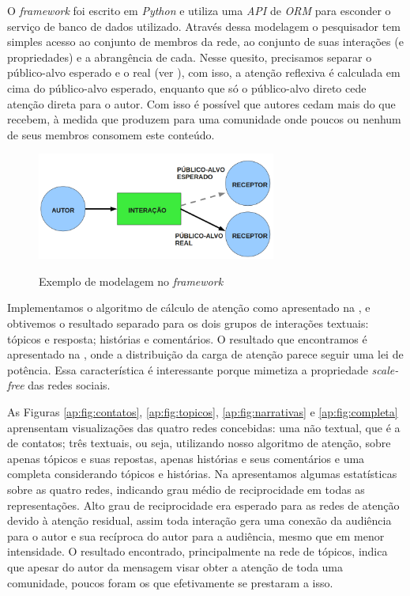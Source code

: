 O \emph{framework} foi escrito em \emph{Python} e utiliza uma \emph{API} de
\emph{ORM} para esconder o serviço de banco de dados utilizado. Através dessa
modelagem o pesquisador tem simples acesso ao conjunto de membros da rede, ao
conjunto de suas interações (e propriedades) e a abrangência de cada. Nesse
quesito, precisamos separar o público-alvo esperado e o real (ver
), com isso, a atenção reflexiva é calculada em cima do
público-alvo esperado, enquanto que só o público-alvo direto cede atenção direta
para o autor. Com isso é possível que autores cedam mais do que recebem, à medida
que produzem para uma comunidade onde poucos ou nenhum de seus membros consomem
este conteúdo.

\begin{figure}[h!]
  \caption{Exemplo de modelagem no \emph{framework}}
  \centering
    \includegraphics[width=0.7\textwidth]{imgs/naif-grafo.png}
    \label{ap:fig:grafo}
\end{figure}

Implementamos o algoritmo de cálculo de atenção como apresentado na
, e obtivemos o resultado separado para os dois grupos
de interações textuais: tópicos e resposta; histórias e comentários. O resultado
que encontramos é apresentado na , onde a distribuição da
carga de atenção parece seguir uma lei de potência. Essa característica é
interessante porque mimetiza a propriedade \emph{scale-free} das redes
sociais. 

As Figuras \ref{ap:fig:contatos}, \ref{ap:fig:topicos}, \ref{ap:fig:narrativas} e
\ref{ap:fig:completa} aprensentam visualizações das quatro redes concebidas: uma
não textual, que é a de contatos; três textuais, ou seja, utilizando nosso
algoritmo de atenção, sobre apenas tópicos e suas repostas, apenas histórias e
seus comentários e uma completa considerando tópicos e histórias. Na
 apresentamos algumas estatísticas sobre as quatro
redes, indicando grau médio de reciprocidade em todas as representações. Alto
grau de reciprocidade era esperado para as redes de atenção devido à atenção
residual, assim toda interação gera uma conexão da audiência para o autor e sua
recíproca do autor para a audiência, mesmo que em menor intensidade. O resultado
encontrado, principalmente na rede de tópicos, indica que apesar do autor da
mensagem visar obter a atenção de toda uma comunidade, poucos foram os que
efetivamente se prestaram a isso.

